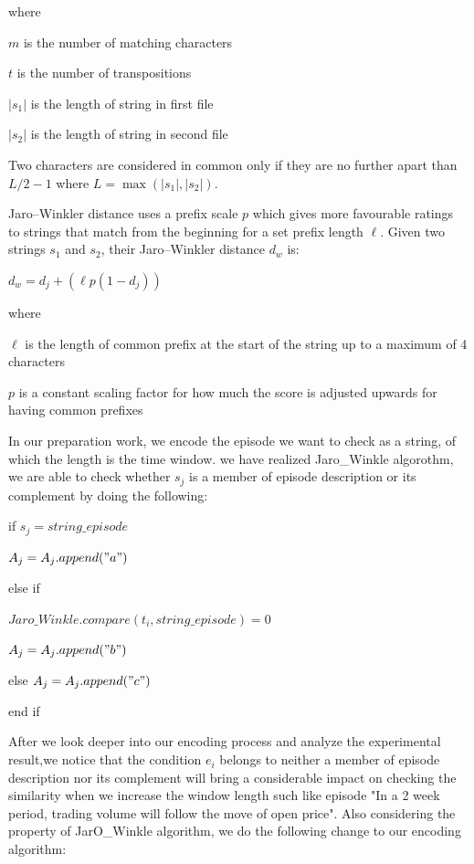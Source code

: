 \documentclass[10pt, conference, compsocconf]{IEEEtran}
\begin{document}
\par where 
\par\quad $m$ is the number of matching characters
\par\quad $t$ is the number of transpositions
\par\quad $\left | s_{1} \right |$ is the length of string in first file 
\par\quad $\left | s_{2} \right |$ is the length of string in second file
\vspace{1.2mm}
\par Two characters are considered in common only if they are no further apart than $L/2-1$ where $L = \max(\left | s_{1} \right |,\left |s_{2}  \right |)$.
\par
Jaro–Winkler distance uses a prefix scale $p$ which gives more favourable ratings to strings that match from the beginning for a set prefix length $\ell$. Given two strings $s_{1}$ and $s_{2}$, their Jaro–Winkler distance $d_{w}$ is:
\par\quad $d_{w}=d_{j}+(\ell p(1-d_{j}))$
\par where
\par\quad $\ell$ is the length of common prefix at the start of the string up to a maximum of 4 characters
\par\quad $p$ is a constant scaling factor for how much the score is adjusted upwards for having common prefixes
\par 
In our preparation work, we encode the episode we want to check as a string, of which the length is the time window. we have realized Jaro\_Winkle algorothm, we are able to check whether $s_{j}$ is a member of episode description or its complement by doing the following:
\vspace{1.2mm}
\par\quad if $s_{j}=string\_episode$
\par\quad $A_{j}=A_{j}.append("a")$
\par\quad else if 
\par\quad $Jaro\_Winkle.compare(t_{i},string\_episode)=0$
\par\quad $A_{j}=A_{j}.append("b")$
\par\quad else $A_{j}=A_{j}.append("c")$
\par\quad end if
\vspace{1.2mm}
\par
After we look deeper into our encoding process and analyze the experimental result,we notice that the condition $e_{i}$ belongs to neither a member of episode description nor its complement will bring a considerable impact on checking the similarity when we increase the window length such like episode "In a 2 week period, trading volume will follow the move of open price". Also considering the property of JarO\_Winkle algorithm, we do the following change to our encoding algorithm:
\end{document}
